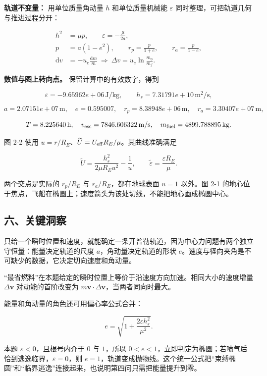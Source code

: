 \documentclass[12pt,a4paper,UTF8]{ctexart}
\begin{document}
\textbf{轨道不变量：} 用单位质量角动量 \(h\) 和单位质量机械能
\(\varepsilon\) 同时整理，可把轨道几何与推进过程分开：

\[\begin{aligned}
h^2&=\mu p,\qquad \varepsilon=-\frac{\mu}{2a},\\
p&=a(1-e^2),\qquad
r_p=\frac{p}{1+e},\qquad r_a=\frac{p}{1-e},\\
\mathrm dv&=-u_e\frac{\mathrm dm}{m}
\ \Longrightarrow\ 
\Delta v=u_e\ln\frac{m_0}{m_f}.
\end{aligned}\]

\textbf{数值与图上转向点。} 保留计算中的有效数字，得到

\[\varepsilon=-9.65962e+06\,\mathrm{J/kg},\qquad h_s=7.31791e+10\,\mathrm{m^2/s},\]

\[a=2.07151e+07\,\mathrm m,\quad e=0.595007,\quad r_p=8.38948e+06\,\mathrm m,\quad r_a=3.30407e+07\,\mathrm m,\]

\[T=8.225640\,\mathrm h,\quad v_{\rm esc}=7846.606322\,\mathrm{m/s},\quad m_{\rm fuel}=4899.788895\,\mathrm{kg}.\]

图 2-2 使用
\(u=r/R_E\)、\(\widetilde U=U_{\rm eff}R_E/\mu\)。其曲线准确满足

\[\widetilde U=\frac{h_s^2}{2\mu R_Eu^2}-\frac1u,\qquad\widetilde\varepsilon=\frac{\varepsilon R_E}\mu.\]

两个交点是实际的 \(r_p/R_E\) 与 \(r_a/R_E\)，都在地球表面 \(u=1\)
以外。图 2-1
的地心位于焦点，飞船在椭圆上；速度箭头为该处切线，不能把地心画成椭圆中心。

\subsection{六、关键洞察}\label{ux516dux5173ux952eux6d1eux5bdf-1}

只给一个瞬时位置和速度，就能确定一条开普勒轨道，因为中心力问题有两个独立守恒量：能量决定轨道的尺度
\(a\)，角动量决定轨道的形状
\(e\)。速度与径向夹角是不可缺少的数据，它决定切向速度和角动量。

``最省燃料''在本题给定的瞬时位置上等价于沿速度方向加速。相同大小的速度增量
\(\Delta\bm v\) 对动能的首阶改变为
\(m\bm v\cdot\Delta\bm v\)，当两者同向时最大。

能量和角动量的角色还可用偏心率公式合并：

\[e=\sqrt{1+\frac{2\varepsilon h_s^2}{\mu^2}}.\]

本题 \(\varepsilon<0\)，且根号内介于 \(0\) 与 \(1\)，所以
\(0<e<1\)，立即判定为椭圆；若喷气后恰到逃逸临界，\(\varepsilon=0\)，则
\(e=1\)，轨道变成抛物线。这个统一公式把``束缚椭圆''和``临界逃逸''连接起来，也说明第四问只需把能量提升到零。
\end{document}
